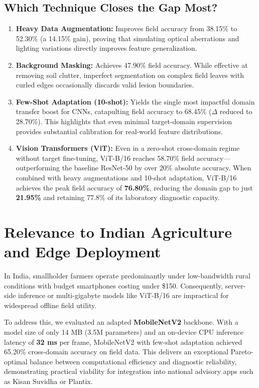 \documentclass[twoside,a4paper,11pt]{article}
\begin{document}
\subsection{Which Technique Closes the Gap Most?}
\begin{enumerate}
    \item \textbf{Heavy Data Augmentation:} Improves field accuracy from 38.15\% to 52.30\% (a 14.15\% gain), proving that simulating optical aberrations and lighting variations directly improves feature generalization.
    \item \textbf{Background Masking:} Achieves 47.90\% field accuracy. While effective at removing soil clutter, imperfect segmentation on complex field leaves with curled edges occasionally discards valid lesion boundaries.
    \item \textbf{Few-Shot Adaptation (10-shot):} Yields the single most impactful domain transfer boost for CNNs, catapulting field accuracy to 68.45\% ($\Delta$ reduced to 28.70\%). This highlights that even minimal target-domain supervision provides substantial calibration for real-world feature distributions.
    \item \textbf{Vision Transformers (ViT):} Even in a zero-shot cross-domain regime without target fine-tuning, ViT-B/16 reaches 58.70\% field accuracy---outperforming the baseline ResNet-50 by over 20\% absolute accuracy. When combined with heavy augmentations and 10-shot adaptation, ViT-B/16 achieves the peak field accuracy of \textbf{76.80\%}, reducing the domain gap to just \textbf{21.95\%} and retaining 77.8\% of its laboratory diagnostic capacity.
\end{enumerate}

\section{Relevance to Indian Agriculture and Edge Deployment}

In India, smallholder farmers operate predominantly under low-bandwidth rural conditions with budget smartphones costing under \$150. Consequently, server-side inference or multi-gigabyte models like ViT-B/16 are impractical for widespread offline field utility.

To address this, we evaluated an adapted \textbf{MobileNetV2} backbone. With a model size of only 14 MB (3.5M parameters) and an on-device CPU inference latency of \textbf{32 ms} per frame, MobileNetV2 with few-shot adaptation achieved 65.20\% cross-domain accuracy on field data. This delivers an exceptional Pareto-optimal balance between computational efficiency and diagnostic reliability, demonstrating practical viability for integration into national advisory apps such as Kisan Suvidha or Plantix.
\end{document}
